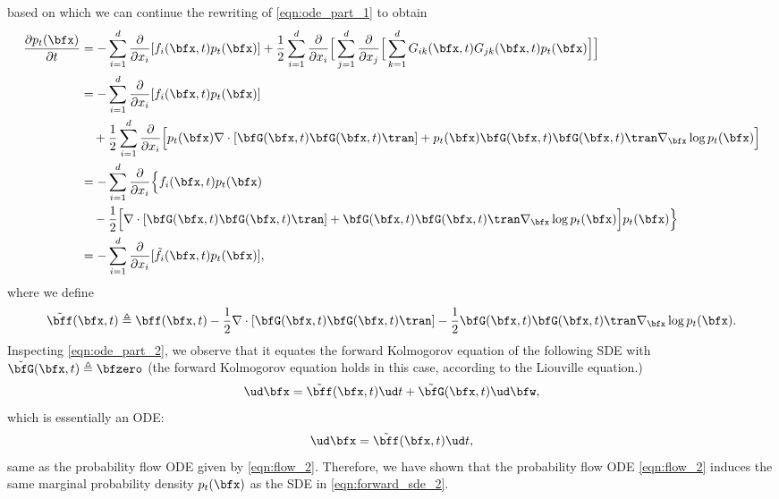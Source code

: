 based on which we can continue the rewriting of \cref{eqn:ode_part_1} to obtain
\begin{align}
    \frac{\partial p_t(\bfx)}{\partial t} &= -\sum_{i=1}^d \frac{\partial}{\partial x_i}[f_i(\bfx, t) p_t(\bfx)] + \frac{1}{2}\sum_{i=1}^d \frac{\partial}{\partial x_i} \Big[ \sum_{j=1}^d \frac{\partial}{\partial x_j}\Big[\sum_{k=1}^d G_{ik}(\bfx, t) G_{jk}(\bfx, t) p_t(\bfx)\Big]\Big]\notag \\
     &= -\sum_{i=1}^d \frac{\partial}{\partial x_i}[f_i(\bfx, t) p_t(\bfx)] \notag \\
     &\quad + \frac{1}{2}\sum_{i=1}^d \frac{\partial}{\partial x_i} \Big[ p_t(\bfx) \nabla \cdot [\bfG(\bfx, t)\bfG(\bfx, t)\tran] + p_t(\bfx) \bfG(\bfx, t)\bfG(\bfx, t)\tran \nabla_\bfx \log p_t(\bfx) \Big]\notag \\
     &= -\sum_{i=1}^d \frac{\partial}{\partial x_i}\Big\{ f_i(\bfx, t)p_t(\bfx) \notag \\
     &\quad - \frac{1}{2} \Big[ \nabla \cdot [\bfG(\bfx, t)\bfG(\bfx, t)\tran] +  \bfG(\bfx, t)\bfG(\bfx, t)\tran \nabla_\bfx \log p_t(\bfx) \Big] p_t(\bfx) \Big\}\notag \\
     &= -\sum_{i=1}^d \frac{\partial}{\partial x_i} [\tilde{f}_i(\bfx, t)p_t(\bfx)],\label{eqn:ode_part_2}
\end{align}
where we define
\begin{align*}
    \tilde{\bff}(\bfx, t) \triangleq \bff(\bfx, t) - \frac{1}{2} \nabla \cdot [\bfG(\bfx, t)\bfG(\bfx, t)\tran] - \frac{1}{2} \bfG(\bfx, t)\bfG(\bfx, t)\tran \nabla_\bfx \log p_t(\bfx).
\end{align*}
Inspecting \cref{eqn:ode_part_2}, we observe that it equates the forward Kolmogorov equation of the following SDE with $\tilde{\bfG}(\bfx, t) \triangleq \bfzero$ (the forward Kolmogorov equation holds in this case, according to the Liouville equation.)
\begin{align*}
    \ud \bfx = \tilde{\bff}(\bfx, t) \ud t + \tilde{\bfG}(\bfx, t) \ud \bfw,
\end{align*}
which is essentially an ODE:
\begin{align*}
    \ud \bfx = \tilde{\bff}(\bfx, t) \ud t,
\end{align*}
same as the probability flow ODE given by \cref{eqn:flow_2}. Therefore, we have shown that the probability flow ODE \cref{eqn:flow_2} induces the same marginal probability density $p_t(\bfx)$ as the SDE in \cref{eqn:forward_sde_2}.

